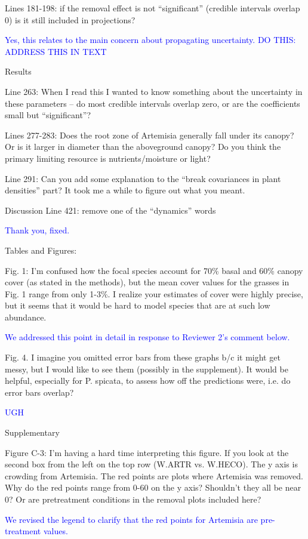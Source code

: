 \documentclass[12pt]{article}
\newcommand{\response}{\textcolor{blue}}
\begin{document}
Lines 181-198: if the removal effect is not “significant” (credible intervals overlap 0) is it still included in projections?

\response{Yes, this relates to the main concern about propagating uncertainty. DO THIS: ADDRESS THIS IN TEXT}


Results

Line 263:  When I read this I wanted to know something about the uncertainty in these parameters – do most credible intervals overlap zero, or are the coefficients small but “significant”?

Lines 277-283: Does the root zone of Artemisia generally fall under its canopy? Or is it larger in diameter than the aboveground canopy? Do you think the primary limiting resource is nutrients/moisture or light?

Line 291: Can you add some explanation to the “break covariances in plant densities” part? It took me a while to figure out what you meant. 

Discussion
Line 421: remove one of the “dynamics” words 

\response{Thank you, fixed.}

Tables and Figures:

Fig. 1: I’m confused how the focal species account for 70\% basal and 60\% canopy cover (as stated in the methods), but the mean cover values for the grasses in Fig. 1 range from only 1-3\%. I realize your estimates of cover were highly precise, but it seems that it would be hard to model species that are at such low abundance.

\response{We addressed this point in detail in response to Reviewer 2's comment below.}

Fig. 4. I imagine you omitted error bars from these graphs b/c it might get messy, but I would like to see them (possibly in the supplement). It would be helpful, especially for P. spicata, to assess how off the predictions were, i.e. do error bars overlap?

\response{UGH}

Supplementary

Figure C-3: I’m having a hard time interpreting this figure. If you look at the second box from the left on the top row (W.ARTR vs. W.HECO). The y axis is crowding from Artemisia. The red points are plots where Artemisia was removed. Why do the red points range from 0-60 on the y axis? Shouldn't they all be near 0? Or are pretreatment conditions in the removal plots included here? 

\response{We revised the legend to clarify that the red points for Artemisia are pre-treatment values.}
\end{document}
